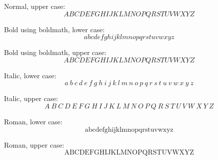 Normal, upper case:
\begin{dmath}[compact,spread={1.250000\baselineskip}] A  B  C  D  E  F  G  H  I  J  K  L  M  N  O  P  Q  R  S  T  U  V  W  X  Y  Z   \end{dmath}

Bold using boldmath, lower case:\boldmath
\begin{dmath}[compact,spread={1.250000\baselineskip}] a  b  c  d  e  f  g  h  i  j  k  l  m  n  o  p  q  r  s  t  u  v  w  x  y  z \end{dmath}\unboldmath

Bold using boldmath, upper case:\boldmath
\begin{dmath}[compact,spread={1.250000\baselineskip}] A  B  C  D  E  F  G  H  I  J  K  L  M  N  O  P  Q  R  S  T  U  V  W  X  Y  Z   \end{dmath}\unboldmath


Italic, lower case:
\begin{dmath}[compact,spread={1.250000\baselineskip}] \mathit{a}~\mathit{b}~\mathit{c}~\mathit{d}~\mathit{e}~\mathit{f}~\mathit{g}~\mathit{h}~\mathit{i}~\mathit{j}~\mathit{k}~\mathit{l}~\mathit{m}~\mathit{n}~\mathit{o}~\mathit{p}~\mathit{q}~\mathit{r}~\mathit{s}~\mathit{t}~\mathit{u}~\mathit{v}~\mathit{w}~\mathit{x}~\mathit{y}~\mathit{z} \end{dmath}

Italic, upper case:
\begin{dmath}[compact,spread={1.250000\baselineskip}] \mathit{A}~\mathit{B}~\mathit{C}~\mathit{D}~\mathit{E}~\mathit{F}~\mathit{G}~\mathit{H}~\mathit{I}~\mathit{J}~\mathit{K}~\mathit{L}~\mathit{M}~\mathit{N}~\mathit{O}~\mathit{P}~\mathit{Q}~\mathit{R}~\mathit{S}~\mathit{T}~\mathit{U}~\mathit{V}~\mathit{W}~\mathit{X}~\mathit{Y}~\mathit{Z} \end{dmath}

Roman, lower case:
\begin{dmath}[compact,spread={1.250000\baselineskip}] \mathrm{a}  \mathrm{b}  \mathrm{c}  \mathrm{d}  \mathrm{e}  \mathrm{f}  \mathrm{g}  \mathrm{h}  \mathrm{i}  \mathrm{j}  \mathrm{k}  \mathrm{l}  \mathrm{m}  \mathrm{n}  \mathrm{o}  \mathrm{p}  \mathrm{q}  \mathrm{r}  \mathrm{s}  \mathrm{t}  \mathrm{u}  \mathrm{v}  \mathrm{w}  \mathrm{x}  \mathrm{y}  \mathrm{z} \end{dmath}

Roman, upper case:
\begin{dmath}[compact,spread={1.250000\baselineskip}] \mathrm{A}  \mathrm{B}  \mathrm{C}  \mathrm{D}  \mathrm{E}  \mathrm{F}  \mathrm{G}  \mathrm{H}  \mathrm{I}  \mathrm{J}  \mathrm{K}  \mathrm{L}  \mathrm{M}  \mathrm{N}  \mathrm{O}  \mathrm{P}  \mathrm{Q}  \mathrm{R}  \mathrm{S}  \mathrm{T}  \mathrm{U}  \mathrm{V}  \mathrm{W}  \mathrm{X}  \mathrm{Y}  \mathrm{Z} \end{dmath}

